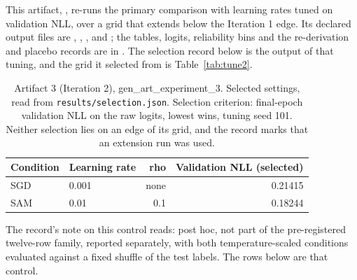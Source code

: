 \documentclass[11pt,letterpaper]{article}
\begin{document}
This artifact, , re-runs the primary comparison with learning rates tuned on validation NLL, over a grid that extends below the Iteration 1 edge. Its declared output files are , , ,  and ; the tables, logits, reliability bins and the re-derivation and placebo records are in . The selection record below is the output of that tuning, and the grid it selected from is Table~\ref{tab:tune2}.

\begin{table}[!htbp]
\centering
\footnotesize
\caption{Artifact 3 (Iteration 2), gen\_art\_experiment\_3. Selected settings, read from \texttt{results/selection.json}. Selection criterion: final-epoch validation NLL on the raw logits, lowest wins, tuning seed 101. Neither selection lies on an edge of its grid, and the record marks that an extension run was used.}
\label{tab:select3}
\begin{tabular}{llrr}
\toprule
Condition & Learning rate & rho & Validation NLL (selected) \\
\midrule
SGD & 0.001 & none & 0.21415 \\
SAM & 0.01 & 0.1 & 0.18244 \\
\bottomrule
\end{tabular}
\end{table}

The record's note on this control reads: post hoc, not part of the pre-registered twelve-row family, reported separately, with both temperature-scaled conditions evaluated against a fixed shuffle of the test labels. The rows below are that control.
\end{document}
